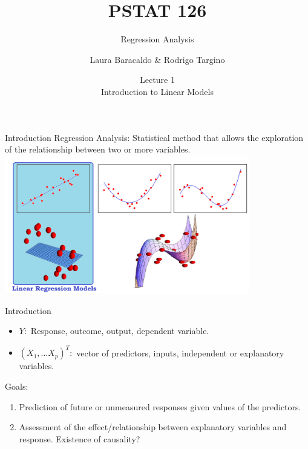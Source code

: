 \documentclass[
  ignorenonframetext,
]{beamer}
\title{PSTAT 126}
\subtitle{Regression Analysis}
\author{Laura Baracaldo \& Rodrigo Targino}
\date{Lecture 1\\
Introduction to Linear Models}
\providecommand{\tightlist}{%
  \setlength{\itemsep}{0pt}\setlength{\parskip}{0pt}}
\begin{document}
\frame{\titlepage}

\begin{frame}{Introduction}
\protect\hypertarget{introduction}{}
Regression Analysis: Statistical method that allows the exploration of
the relationship between two or more variables.
\includegraphics[width=0.8\textwidth,height=\textheight]{image1.png}\\
\end{frame}

\begin{frame}{Introduction}
\protect\hypertarget{introduction-1}{}
\begin{itemize}
\tightlist
\item
  \(Y:\) Response, outcome, output, dependent variable.
\item
  \((X_1, ...X_p)^T:\) vector of predictors, inputs, independent or
  explanatory variables.
\end{itemize}

Goals:

\begin{enumerate}
\tightlist
\item
  Prediction of future or unmeasured responses given values of the
  predictors.
\item
  Assessment of the effect/relationship between explanatory variables
  and response. Existence of causality?
\end{enumerate}
\end{frame}
\end{document}
